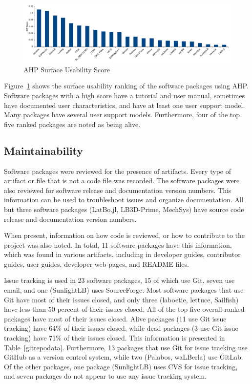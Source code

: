 \documentclass[final, 3p, times, authoryear]{elsarticle}
\begin{document}
\begin{figure}[h!]
	\begin{center}
		\includegraphics[width=1.0\textwidth]{./figures/usability_chart.pdf}
		\caption{AHP Surface Usability Score}
		\label{Fig_Usability}
	\end{center}
\end{figure}

Figure~\ref{Fig_Usability} shows the surface usability ranking of the software
packages using AHP. Software packages with a high score have a tutorial and user
manual, sometimes have documented user characteristics, and have at least one
user support model. Many packages have several user support models. Furthermore,
four of the top five ranked packages are noted as being alive. 

\subsection{Maintainability}

Software packages were reviewed for the presence of artifacts. Every type of
artifact or file that is not a code file was recorded. The software packages
were also reviewed for software release and documentation version numbers. This
information can be used to troubleshoot issues and organize documentation. All
but three software packages (LatBo.jl, LB3D-Prime, MechSys) have source code
release and documentation version numbers.

When present, information on how code is reviewed, or how to contribute to the
project was also noted. In total, 11 software packages have this information,
which was found in various artifacts, including in developer guides, contributor
guides, user guides, developer web-pages, and README files. 

Issue tracking is used in 23 software packages, 15 of which use Git, seven use
email, and one (SunlightLB) uses SourceForge. Most software packages that use
Git have most of their issues closed, and only three (laboetie, lettuce,
Sailfish) have less than 50 percent of their issues closed. All of the top five
overall ranked packages have most of their issues closed. Alive packages (11 use Git issue tracking) have 64\% of their issues closed, while dead packages (3 use Git issue tracking) have 71\% of their issues closed. This information is presented in Table~\ref{gitrepodata}. Furthermore, 13 packages that use Git for issue tracking use GitHub as a version control system, while two (Palabos, waLBerla) use GitLab. Of the other packages, one package (SunlightLB) uses CVS for issue tracking, and seven packages do not appear to use any issue tracking system.
\end{document}
